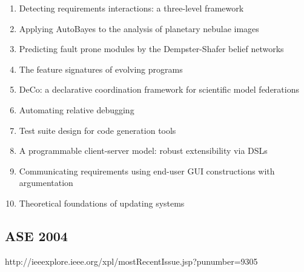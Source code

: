 \begin{enumerate}[itemsep=-1ex]
  \item Detecting requirements interactions: a three-level framework
  \item Applying AutoBayes to the analysis of planetary nebulae images
  \item Predicting fault prone modules by the Dempster-Shafer belief networks
  \item The feature signatures of evolving programs
  \item DeCo: a declarative coordination framework for scientific model federations
  \item Automating relative debugging
  \item Test suite design for code generation tools
  \item A programmable client-server model: robust extensibility via DSLs
  \item Communicating requirements using end-user GUI constructions with argumentation
  \item Theoretical foundations of updating systems
\end{enumerate}

\subsection{ASE 2004}

http://ieeexplore.ieee.org/xpl/mostRecentIssue.jsp?punumber=9305

